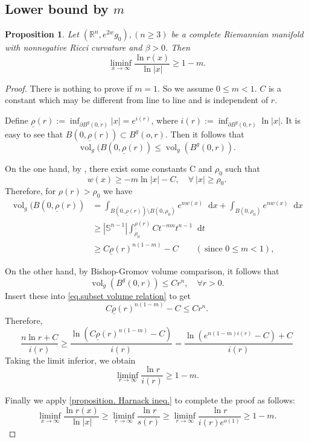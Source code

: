 \documentclass[10pt,a4paper]{amsart}
\newtheorem{proposition}[theorem]{Proposition}
\numberwithin{equation}{section}
\newcommand{\dd}{\mathop{}\!\mathrm{d}}%
\newcommand{\dx}{\mathop{}\!\mathrm{d}x}
\begin{document}
\subsection{Lower bound by $m$}
\begin{proposition}\label{proposition. second part}
    Let $(\mathbb{R}^n,e^{2w}g_0), (n\geq 3)$ be a complete Riemannian manifold with nonnegative Ricci curvature and $\beta>0$.
    Then 
    \[
        \liminf_{x\to \infty}\frac{\ln r(x)}{\ln |x|}\geq 1-m.
    \]

\end{proposition}
\begin{proof}   
There is nothing to prove if $m=1$. So we assume $0\leq m<1$. $C$ is a constant which may be different from line to line and is independent of $r$.
    
Define $\underline{\rho}(r):=\inf_{\partial B^g(0,r) }|x|=e^{i(r)}$, where $i(r):=\inf_{\partial B^g(0,r)}\ln |x| $. It is easy to see that 
    $B(0,\underline{\rho}(r))\subset B^g(o,r)$. Then it follows that
    \begin{equation}\label{eq.subset volume relation}
        \operatorname{vol}_g(B(0,\underline{\rho}(r))
        \leq \operatorname{vol}_g(B^g(0,r)).
    \end{equation}

    On the one hand, by \cite[Theorem 1.3]{MQ}, there exist some constants C and $\rho_0$ such that
    \begin{equation}\label{ineq. pointwise lower bound of phi}
        w(x)\geq -m\ln |x|-C,\quad \forall \ |x| \geq \rho_0.
    \end{equation}
    Therefore, for $\rho(r)> \rho_0$ we have
    \begin{align*}
        \operatorname{vol}_g
        (B(0,\underline{\rho}(r))
        &=\int_{B(0,\underline{\rho}(r))\setminus B(0,\rho_0)} e^{nw(x)}\dx
        +\int_{B(0,\rho_0)} e^{nw(x)}\dx\\
        &\geq |\mathbb{S}^{n-1}|\int_{\rho_0}^{\underline{\rho}(r)}C t^{-mn}t^{n-1}\dd t
        \\
        &\geq
            C\underline{\rho}(r)^{n(1-m)}-C \quad\quad(\ \text{since } 0\leq m<1), 
    \end{align*}
    
    On the other hand, by Bishop-Gromov volume comparison, it follows that
    \[
        \operatorname{vol}_g(B^g(0,r))\leq Cr^n,\quad \forall r>0.
    \]
    Insert these into \cref{eq.subset volume relation} to get
    \[
        C\underline{\rho}(r)^{n(1-m)}-C\leq C r^n.
    \]
    Therefore,
    \[
        \frac{n\ln r+C}{i(r)}\geq \frac{\ln(C\underline{\rho}(r)^{n(1-m)}-C)}{i(r)}=\frac{\ln (e^{n(1-m)i(r) }-C)+C}{i(r)}
    \]
Taking the limit inferior, we obtain
    \[
        \liminf_{r\to \infty}\frac{\ln r}{i(r)}\geq 1-m.
    \]

Finally we apply \cref{proposition. Harnack ineq.} to complete the proof as follows:
    \[
        \liminf_{x\to\infty}\frac{\ln r(x)}{\ln |x|}\geq 
        \liminf_{r\to \infty}\frac{\ln r}{s(r)}
        \geq \liminf_{r\to \infty}\frac{\ln r}{i(r)e^{o(1)}}\geq 1-m.
    \]
\end{proof}
\end{document}
